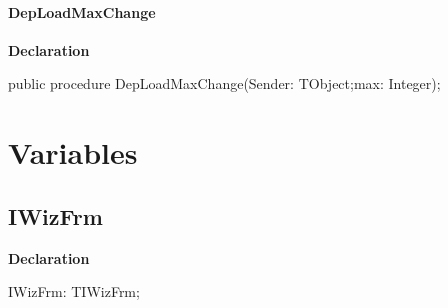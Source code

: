 \documentclass{report}
\newif\ifpdf
\begin{document}
\paragraph*{DepLoadMaxChange}\hspace*{\fill}

\label{igobase.TIWizFrm-DepLoadMaxChange}
\begin{list}{}{
\setlength{\itemindent}{0cm}
\setlength{\listparindent}{0cm}
\setlength{\leftmargin}{\evensidemargin}
\addtolength{\leftmargin}{\tmplength}
\settowidth{\labelsep}{X}
\addtolength{\leftmargin}{\labelsep}
\setlength{\labelwidth}{\tmplength}
}
\item[\textbf{Declaration}\hfill]
\ifpdf
\begin{flushleft}
\fi
\begin{ttfamily}
public procedure DepLoadMaxChange(Sender: TObject;max: Integer);\end{ttfamily}

\ifpdf
\end{flushleft}
\fi

\end{list}
\section{Variables}
\ifpdf
\subsection*{\large{\textbf{IWizFrm}}\normalsize\hspace{1ex}\hrulefill}
\else
\subsection*{IWizFrm}
\fi
\label{igobase-IWizFrm}
\begin{list}{}{
\setlength{\itemindent}{0cm}
\setlength{\listparindent}{0cm}
\setlength{\leftmargin}{\evensidemargin}
\addtolength{\leftmargin}{\tmplength}
\settowidth{\labelsep}{X}
\addtolength{\leftmargin}{\labelsep}
\setlength{\labelwidth}{\tmplength}
}
\item[\textbf{Declaration}\hfill]
\ifpdf
\begin{flushleft}
\fi
\begin{ttfamily}
IWizFrm: TIWizFrm;\end{ttfamily}

\ifpdf
\end{flushleft}
\fi

\end{list}
\ifpdf
\end{document}
